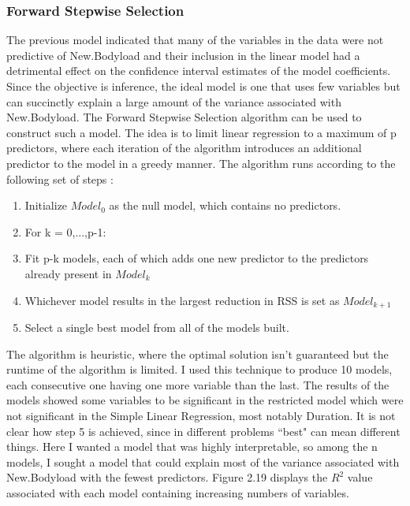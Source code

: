 \subsubsection{Forward Stepwise Selection}
The previous model indicated that many of the variables in the data were not predictive of New.Bodyload and their inclusion in the linear model had a detrimental effect on the confidence interval estimates of the model coefficients. Since the objective is inference, the ideal model is one that uses few variables but can succinctly explain a large amount of the variance associated with New.Bodyload. The Forward Stepwise Selection algorithm can be used to construct such a model. The idea is to limit linear regression to a maximum of p predictors, where each iteration of the algorithm introduces an additional predictor to the model in a greedy manner. The algorithm runs according to the following set of steps \cite{ISLR}: 
\begin{enumerate}
	\item Initialize $Model_0$ as the null model, which contains no predictors.
	\item For k = 0,...,p-1:
	\item Fit p-k models, each of which adds one new predictor to the predictors already present in $Model_k$
	\item Whichever model results in the largest reduction in RSS is set as $Model_{k+1}$
	\item Select a single best model from all of the models built.
\end{enumerate}
The algorithm is heuristic, where the optimal solution isn't guaranteed but the runtime of the algorithm is limited. I used this technique to produce 10 models, each consecutive one having one more variable than the last. The results of the models showed some variables to be significant in the restricted model which were not significant in the Simple Linear Regression, most notably Duration. It is not clear how step 5 is achieved, since in different problems ``best" can mean different things. Here I wanted a model that was highly interpretable, so among the n models, I sought a model that could explain most of the variance associated with New.Bodyload with the fewest predictors. Figure 2.19 displays the $R^2$ value associated with each model containing increasing numbers of variables.

